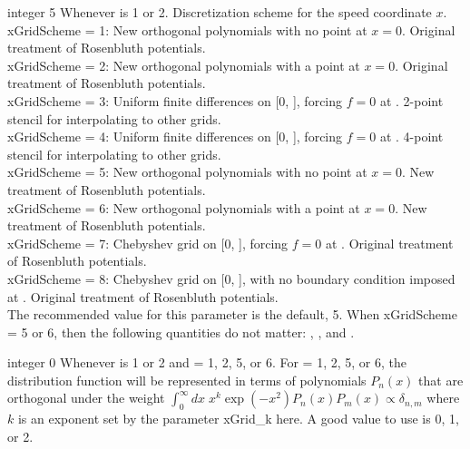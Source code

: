 \myhrule

{integer}
{5}
{Whenever  is 1 or 2.}
{Discretization scheme for the speed coordinate $x$.\\

{\ttfamily xGridScheme} = 1: New orthogonal polynomials with no point at $x=0$. Original treatment of Rosenbluth potentials.\\

{\ttfamily xGridScheme} = 2: New orthogonal polynomials with a point at $x=0$. Original treatment of Rosenbluth potentials.\\

{\ttfamily xGridScheme} = 3: Uniform finite differences on [0, ], forcing $f=0$ at . 2-point stencil for interpolating to other grids.\\

{\ttfamily xGridScheme} = 4: Uniform finite differences on [0, ], forcing $f=0$ at . 4-point stencil for interpolating to other grids.\\

{\ttfamily xGridScheme} = 5: New orthogonal polynomials with no point at $x=0$. New treatment of Rosenbluth potentials.\\

{\ttfamily xGridScheme} = 6: New orthogonal polynomials with a point at $x=0$. New treatment of Rosenbluth potentials.\\

{\ttfamily xGridScheme} = 7: Chebyshev grid on [0, ], forcing $f=0$ at . Original treatment of Rosenbluth potentials.\\

{\ttfamily xGridScheme} = 8: Chebyshev grid on [0, ], with no boundary condition imposed at . Original treatment of Rosenbluth potentials.\\

The recommended value for this parameter is the default, 5.  
When {\ttfamily xGridScheme} = 5 or 6, then the following quantities do not matter: 
, , and .}

\myhrule

{integer}
{0}
{Whenever  is 1 or 2 and  = 1, 2, 5, or 6.}
{For  = 1, 2, 5, or 6, the distribution function will be represented in terms of polynomials $P_n(x)$
that are orthogonal under the weight $\int_0^\infty dx\; x^k \exp(-x^2) P_n(x) P_m(x)  \propto  \delta_{n,m}$
where $k$ is an exponent set by the parameter {\ttfamily xGrid\_k} here.
A good value to use is 0, 1, or 2.}

